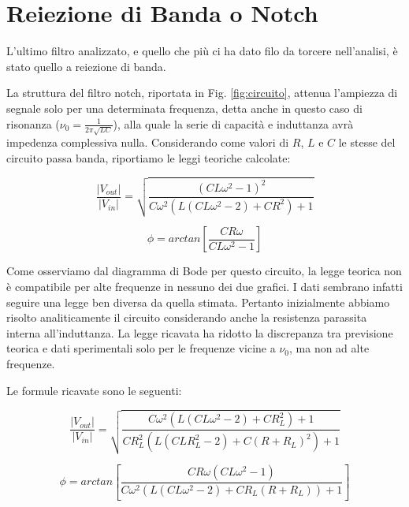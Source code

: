 \section{Reiezione di Banda o Notch}
L'ultimo filtro analizzato, e quello che più ci ha dato filo da torcere nell'analisi, è stato quello a reiezione di banda.

La struttura del filtro notch, riportata in Fig. \ref{fig:circuito}, attenua l'ampiezza di segnale solo per una determinata frequenza, detta anche in questo caso di risonanza ($\nu_0=\frac{1}{2 \pi \sqrt{LC}}$), alla quale la serie di capacità e induttanza avrà impedenza complessiva nulla. Considerando come valori di $R$, $L$ e $C$ le stesse del circuito passa banda, riportiamo le leggi teoriche calcolate:\\

\noindent
\begin{minipage}{.5\linewidth}
\begin{equation}
\frac{|V_{out}|}{|V_{in}|}=\sqrt{\frac{\left(C L \omega ^2-1\right)^2}{C \omega ^2 \left(L \left(C L \omega ^2-2\right)+C R^2\right)+1}}
\label{notchGain}
\end{equation}
\end{minipage}%
\begin{minipage}{.5\linewidth}
\begin{equation}
\phi=arctan\left[\frac{C R \omega}{C L \omega ^2-1}\right]
\label{notchPhi}
\end{equation}
\end{minipage}
\break

Come osserviamo dal diagramma di Bode per questo circuito, la legge teorica non è compatibile per alte frequenze in nessuno dei due grafici. I dati sembrano infatti seguire una legge ben diversa da quella stimata. Pertanto inizialmente abbiamo risolto analiticamente il circuito considerando anche la resistenza parassita interna all'induttanza. La legge ricavata ha ridotto la discrepanza tra previsione teorica e dati sperimentali solo per le frequenze vicine a $\nu_0$, ma non ad alte frequenze.

Le formule ricavate sono le seguenti:\\

\noindent
\begin{minipage}{.5\linewidth}
\begin{equation}
\frac{|V_{out}|}{|V_{in}|}=\sqrt{\frac{C \omega ^2 \left(L \left(C L \omega ^2-2\right)+C R_L^2\right)+1}{C R_L^2 \left(L \left(C L R_L^2-2\right)+C (R+R_L)^2\right)+1}}
\label{eq:notchGain_corr}
\end{equation}

\end{minipage}%
\begin{minipage}{.5\linewidth}
\begin{equation}
\phi=arctan\left[\frac{C R \omega \left(C L \omega ^2-1\right)}{C \omega ^2 \left(L \left(C L \omega ^2-2\right)+C R_L (R+R_L)\right)+1}\right]
\label{eq:notchPhi_corr}
\end{equation}
\end{minipage}
\break

